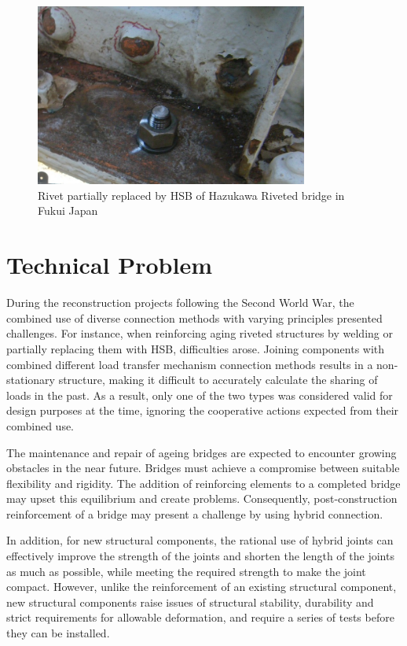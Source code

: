 \begin{figure}
    \centering
    \includegraphics[width=0.8\textwidth]{imgs/intro/HSB-rivet.JPG}
    \caption{Rivet partially replaced by HSB of Hazukawa Riveted bridge in Fukui Japan}
    \label{fig:enter-label}
\end{figure}


\section{Technical Problem}

During the reconstruction projects following the Second World War, the combined use of diverse connection methods with varying principles presented challenges. For instance, when reinforcing aging riveted structures by welding or partially replacing them with \ac{HSB}, difficulties arose. Joining components with combined different load transfer mechanism connection methods results in a non-stationary structure, making it difficult to accurately calculate the sharing of loads in the past. As a result, only one of the two types was considered valid for design purposes at the time, ignoring the cooperative actions expected from their combined use.

The maintenance and repair of ageing bridges are expected to encounter growing obstacles in the near future. Bridges must achieve a compromise between suitable flexibility and rigidity. The addition of reinforcing elements to a completed bridge may upset this equilibrium and create problems. Consequently, post-construction reinforcement of a bridge may present a challenge by using hybrid connection.

In addition, for new structural components, the rational use of hybrid joints can effectively improve the strength of the joints and shorten the length of the joints as much as possible, while meeting the required strength to make the joint compact.  However, unlike the reinforcement of an existing structural component, new structural components raise issues of structural stability, durability and strict requirements for allowable deformation, and require a series of tests before they can be installed.

